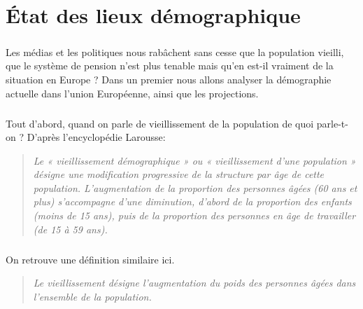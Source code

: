 \chapter{État des lieux démographique}
\paragraph{}Les médias et les politiques nous rabâchent sans cesse que la population vieilli, que le système de pension n’est plus tenable mais qu’en est-il vraiment de la situation en Europe ?  Dans un premier nous allons analyser la démographie actuelle dans l’union Européenne, ainsi que les projections.

\paragraph{}Tout d'abord, quand on parle de vieillissement de la population de quoi parle-t-on ? D’après l’encyclopédie Larousse\citep{larousse}: 
\begin{quotation}
\textit{Le « vieillissement démographique » ou « vieillissement d'une population » désigne une modification progressive de la structure par âge de cette population. L'augmentation de la proportion des personnes âgées (60 ans et plus) s'accompagne d'une diminution, d'abord de la proportion des enfants (moins de 15 ans), puis de la proportion des personnes en âge de travailler (de 15 à 59 ans).}
\end{quotation}

\paragraph{}On retrouve une définition similaire ici\citep{etudiant}.
\begin{quotation}
\textit{Le vieillissement désigne l’augmentation du poids des personnes âgées dans l’ensemble de la population.}
\end{quotation}


